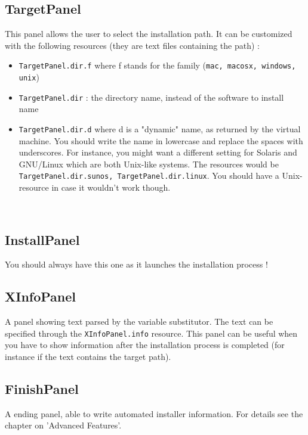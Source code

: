 \subsection{TargetPanel}

This panel allows the user to select the installation path. It can be customized with
the following resources (they are text files containing the path) :
\begin{itemize}

  \item \texttt{TargetPanel.dir.f} where f stands for the family (\texttt{mac,
  macosx, windows, unix})
  \item \texttt{TargetPanel.dir} : the directory name, instead of the software
  to install name
  \item \texttt{TargetPanel.dir.d} where d is a "dynamic" name, as returned by
  the \Java virtual machine. You should write the name in lowercase and replace the
  spaces with underscores. For instance, you might want a different setting for
  Solaris and GNU/Linux which are both Unix-like systems. The resources would be
  \texttt{TargetPanel.dir.sunos, TargetPanel.dir.linux}. You should have a
  Unix-resource in case it wouldn't work though.

\end{itemize}\

\subsection{InstallPanel}

You should always have this one as it launches the installation process !\\

\subsection{XInfoPanel}

A panel showing text parsed by the variable substitutor. The text can be
specified through the \texttt{XInfoPanel.info} resource. This panel can
be useful when you have to show information after the installation
process is completed (for instance if the text contains the target
path).\\

\subsection{FinishPanel}

A ending panel, able to write automated installer information. For
details see the chapter on 'Advanced Features'.\\ 

